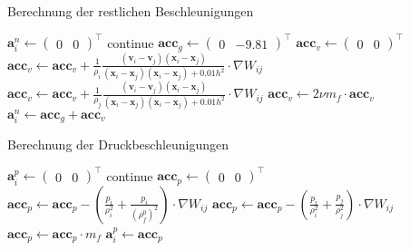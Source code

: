 \documentclass{scrreprt}
\begin{document}
\begin{algorithm}
\caption{Berechnung der restlichen Beschleunigungen}
\label{alg:restliche_beschleunigung}
\begin{algorithmic}
        \STATE $\textbf{a}_i^n \gets \begin{pmatrix}0 & 0 \end{pmatrix}^\intercal$
        \STATE continue
    \ENDIF
    \STATE $\textbf{acc}_g \gets \begin{pmatrix}0 &-9.81 \end{pmatrix}^\intercal$
    \STATE $\textbf{acc}_v \gets \begin{pmatrix}0 & 0 \end{pmatrix}^\intercal$
    \STATE
    \STATE {}
            \STATE $\textbf{acc}_v \gets \textbf{acc}_v + \frac{1}{\rho_i} \frac{(\textbf{v}_i - \textbf{v}_j)(\textbf{x}_i - \textbf{x}_j)}{(\textbf{x}_i - \textbf{x}_j)(\textbf{x}_i - \textbf{x}_j) + 0.01h^2} \cdot \nabla W_{ij}$
        \ELSE
            \STATE $\textbf{acc}_v \gets \textbf{acc}_v + \frac{1}{\rho_j} \frac{(\textbf{v}_i - \textbf{v}_j)(\textbf{x}_i - \textbf{x}_j)}{(\textbf{x}_i - \textbf{x}_j)(\textbf{x}_i - \textbf{x}_j) + 0.01h^2} \cdot \nabla W_{ij}$
        \ENDIF
    \ENDFOR
    \STATE $\textbf{acc}_v \gets 2\nu m_f \cdot \textbf{acc}_v$
    \STATE
    \STATE $\textbf{a}_i^n \gets \textbf{acc}_g + \textbf{acc}_v$
\ENDFOR
\end{algorithmic}
\end{algorithm}

\begin{algorithm}
\caption{Berechnung der Druckbeschleunigungen}
\label{alg:druckbeschleunigung}
\begin{algorithmic}
        \STATE $\textbf{a}_i^p \gets \begin{pmatrix}0 & 0 \end{pmatrix}^\intercal$
        \STATE continue
    \ENDIF
    \STATE $\textbf{acc}_p \gets \begin{pmatrix}0 & 0 \end{pmatrix}^\intercal$
    \STATE
    \STATE {}
            \STATE $\textbf{acc}_p \gets \textbf{acc}_p - \left(\frac{p_i}{\rho_i^2} + \frac{p_i}{\left(\rho_f^0\right)^2}\right) \cdot \nabla W_{ij}$ 
        \ELSE
            \STATE $\textbf{acc}_p \gets \textbf{acc}_p - \left(\frac{p_i}{\rho_i^2} + \frac{p_j}{\rho_j^2}\right) \cdot \nabla W_{ij}$
        \ENDIF
    \ENDFOR
    \STATE $\textbf{acc}_p \gets \textbf{acc}_p \cdot m_f$
    \STATE
    \STATE $\textbf{a}_i^p \gets \textbf{acc}_p$
\ENDFOR
\end{algorithmic}
\end{algorithm}
\end{document}

